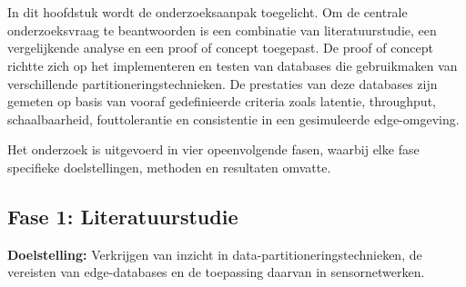 
\chapter{}%
\label{ch:methodologie}


In dit hoofdstuk wordt de onderzoeksaanpak toegelicht. 
Om de centrale onderzoeksvraag te beantwoorden is een combinatie van literatuurstudie, een vergelijkende analyse en een proof of concept toegepast. 
De proof of concept richtte zich op het implementeren en testen van databases die gebruikmaken van verschillende partitioneringstechnieken. 
De prestaties van deze databases zijn gemeten op basis van vooraf gedefinieerde criteria zoals latentie, throughput, schaalbaarheid, fouttolerantie en consistentie in een gesimuleerde edge-omgeving.

Het onderzoek is uitgevoerd in vier opeenvolgende fasen, waarbij elke fase specifieke doelstellingen, methoden en resultaten omvatte.

\section*{Fase 1: Literatuurstudie}

\textbf{Doelstelling:}  
Verkrijgen van inzicht in data-partitioneringstechnieken, de vereisten van edge-databases en de toepassing daarvan in sensornetwerken.

